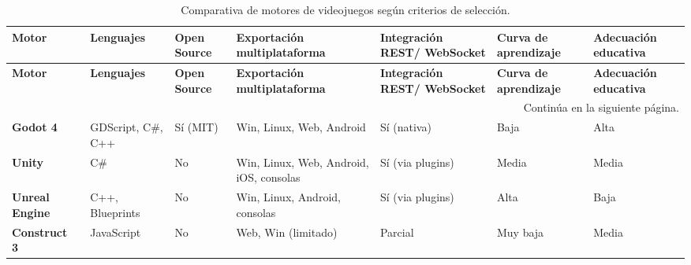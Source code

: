\begin{center}
	\setlength{\tabcolsep}{4pt}
	\begin{longtable}{|p{2cm}|p{2cm}|p{1.3cm}|p{1.8cm}|p{2cm}|p{2cm}|p{2cm}|}
		\caption{Comparativa de motores de videojuegos según criterios de selección.}
		\label{tab:motores-videojuegos} \\
		
		\hline
		\small\textbf{Motor} &
		\small\textbf{Lenguajes} &
		\small\textbf{Open Source} &
		\small\textbf{Exportación multiplataforma} &
		\small\textbf{Integración REST/ WebSocket} &
		\small\textbf{Curva de aprendizaje} &
		\small\textbf{Adecuación educativa} \\
		\hline
		\endfirsthead
		
		\hline
		\small\textbf{Motor} &
		\small\textbf{Lenguajes} &
		\small\textbf{Open Source} &
		\small\textbf{Exportación multiplataforma} &
		\small\textbf{Integración REST/ WebSocket} &
		\small\textbf{Curva de aprendizaje} &
		\small\textbf{Adecuación educativa} \\
		\hline
		\endhead
		
		\hline
		\multicolumn{7}{r}{\small Continúa en la siguiente página.} \\
		\endfoot
		
		\hline
		\endlastfoot
		
		\small\textbf{Godot 4}~\cite{godot}
		& \small GDScript, C\#, C++
		& \small Sí (MIT)
		& \small Win, Linux, Web, Android
		& \small Sí (nativa)
		& \small Baja
		& \small Alta \\
		\hline
		
		\small\textbf{Unity}~\cite{unity}
		& \small C\#
		& \small No
		& \small Win, Linux, Web, Android, iOS, consolas
		& \small Sí (via plugins)
		& \small Media
		& \small Media \\
		\hline
		
		\small\textbf{Unreal Engine}~\cite{unreal}
		& \small C++, Blueprints
		& \small No 
		& \small Win, Linux, Android, consolas
		& \small Sí (via plugins)
		& \small Alta
		& \small Baja \\
		\hline
		
		\small\textbf{Construct 3}~\cite{construct}
		& \small JavaScript
		& \small No
		& \small Web, Win (limitado)
		& \small Parcial
		& \small Muy baja
		& \small Media \\
		\hline
		
	\end{longtable}
\end{center}

